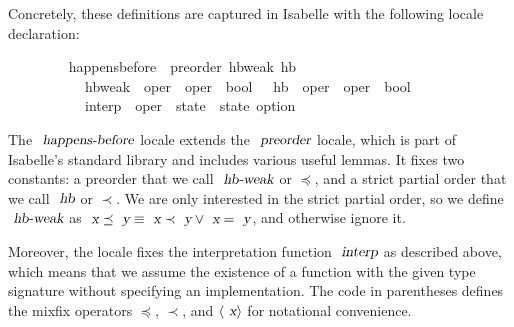 Concretely, these definitions are captured in Isabelle with the following locale declaration:
\vspace{0.35em}
\begin{isabellebody}
\ \ \ \ \ \ \ \  happens{\isacharunderscore}before\ {\isacharequal}\ preorder\ hb{\isacharunderscore}weak\ hb\isanewline
\ \ \ \ \ \ \ \ \ \ \ hb{\isacharunderscore}weak\ {\isacharcolon}{\isacharcolon}\ {\isachardoublequoteopen}{\isacharprime}oper\ {\isasymRightarrow}\ {\isacharprime}oper\ {\isasymRightarrow}\ bool{\isachardoublequoteclose}\ \ \ hb\ {\isacharcolon}{\isacharcolon}\ {\isachardoublequoteopen}{\isacharprime}oper\ {\isasymRightarrow}\ {\isacharprime}oper\ {\isasymRightarrow}\ bool{\isachardoublequoteclose}\ {\isacharplus}\isanewline
\ \ \ \ \ \ \ \ \ \ \ interp\ {\isacharcolon}{\isacharcolon}\ {\isachardoublequoteopen}{\isacharprime}oper\ {\isasymRightarrow}\ {\isacharprime}state\ {\isasymRightarrow}\ {\isacharprime}state\ option{\isachardoublequoteclose}
\end{isabellebody}
\vspace{0.35em}
The $\isa{happens-before}$ locale extends the $\isa{preorder}$ locale, which is part of Isabelle's standard library and includes various useful lemmas.
It fixes two constants: a preorder that we call $\isa{hb-weak}$ or $\preceq$, and a strict partial order that we call $\isa{hb}$ or $\prec$.
We are only interested in the strict partial order, so we define $\isa{hb-weak}$ as $\isa{x}\preceq\isa{y} \equiv \isa{x}\prec\isa{y} \vee \isa{x}=\isa{y}$, and otherwise ignore it.

Moreover, the locale fixes the interpretation function $\isa{interp}$ as described above, which means that we assume the existence of a function with the given type signature without specifying an implementation.
The code in parentheses defines the mixfix operators $\preceq$, $\prec$, and $\langle\isa{x}\rangle$ for notational convenience.

